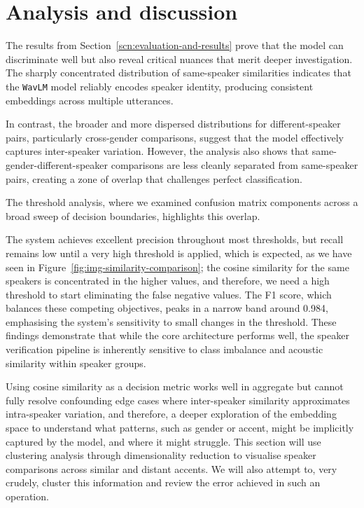 \documentclass[conference]{IEEEtran}
\begin{document}
	
	
	\section{Analysis and discussion}
	
	The results from Section~\ref{scn:evaluation-and-results} prove that the model can discriminate well but also reveal critical nuances that merit deeper investigation. The sharply concentrated distribution of same-speaker similarities indicates that the \texttt{WavLM} model reliably encodes speaker identity, producing consistent embeddings across multiple utterances.
	
	In contrast, the broader and more dispersed distributions for different-speaker pairs, particularly cross-gender comparisons, suggest that the model effectively captures inter-speaker variation. However, the analysis also shows that same-gender-different-speaker comparisons are less cleanly separated from same-speaker pairs, creating a zone of overlap that challenges perfect classification.
	
	The threshold analysis, where we examined confusion matrix components across a broad sweep of decision boundaries, highlights this overlap. 
	
	The system achieves excellent precision throughout most thresholds, but recall remains low until a very high threshold is applied, which is expected, as we have seen in Figure~\ref{fig:img-similarity-comparison}; the cosine similarity for the same speakers is concentrated in the higher values, and therefore, we need a high threshold to start eliminating the false negative values. The F1 score, which balances these competing objectives, peaks in a narrow band around 0.984, emphasising the system's sensitivity to small changes in the threshold. These findings demonstrate that while the core architecture performs well, the speaker verification pipeline is inherently sensitive to class imbalance and acoustic similarity within speaker groups. 
	
	Using cosine similarity as a decision metric works well in aggregate but cannot fully resolve confounding edge cases where inter-speaker similarity approximates intra-speaker variation, and therefore, a deeper exploration of the embedding space to understand what patterns, such as gender or accent, might be implicitly captured by the model, and where it might struggle. This section will use clustering analysis through dimensionality reduction to visualise speaker comparisons across similar and distant accents. We will also attempt to, very crudely, cluster this information and review the error achieved in such an operation.
	
\end{document}
